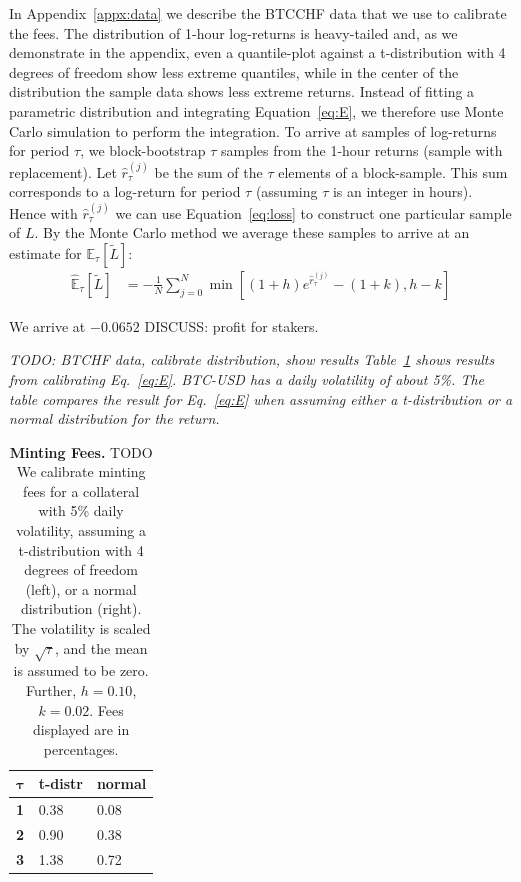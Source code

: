 \documentclass[english,11pt]{article}
\begin{document}
In Appendix~\ref{appx:data} we describe the BTCCHF data that we use to calibrate the
fees. The distribution of 1-hour log-returns is heavy-tailed and, as we demonstrate in the appendix,
even a quantile-plot against a t-distribution with 4 degrees of freedom show less extreme quantiles,
while in the center of the distribution the sample data shows less extreme returns.
Instead of fitting a parametric distribution and integrating Equation~\eqref{eq:E}, we therefore use 
Monte Carlo simulation to perform the integration. To arrive at samples of log-returns for period
$\tau$, we block-bootstrap $\tau$ samples from the 1-hour returns (sample with replacement). Let $\hat{r}_{\tau}^{(j)}$ be the 
sum of the $\tau$ elements of a block-sample. This sum corresponds to a log-return for period $\tau$ (assuming $\tau$ is an integer in hours). 
Hence with $\hat{r}_{\tau}^{(j)}$ we can use Equation~\eqref{eq:loss} 
to construct one particular sample of $L$. By the Monte Carlo method we average these samples
to arrive at an estimate for $\mathbb{E}_{\tau}\left[\tilde{L} \right]$:
\begin{align}
\mathbb{\hat{E}}_{\tau}\left[\tilde{L} \right] &= - \frac{1}{N} \sum_{j=0}^N \min\left[(1 + h) e^{\hat{r}_{\tau}^{(j)}} - (1+k), h-k\right]
\end{align}

We arrive at $-0.0652$ DISCUSS: profit for stakers.


\emph{TODO: BTCHF data, calibrate distribution, show results
Table~\ref{tab:calibration} shows results
from calibrating Eq.~\eqref{eq:E}. BTC-USD has a daily volatility of about 5\%. 
The table compares the result for Eq.~\eqref{eq:E} when assuming
either a t-distribution or a normal distribution for the return.}


\begin{table}[]
\caption{\textbf{Minting Fees.}
    TODO We calibrate minting fees for a collateral with 5\% daily volatility,
    assuming a t-distribution with 4 degrees of freedom (left), or a normal
    distribution (right). The volatility is scaled by $\sqrt{\tau}$, and the
    mean is assumed to be zero. Further, $h=0.10$, $k=0.02$. Fees displayed are in percentages.} %
	\begin{center}
	\begin{tabular}{lll}
	\hline
	\textbf{$\mathbf{\tau}$} & \textbf{t-distr} & \textbf{normal} \\
	\hline
	\textbf{1}                   & 0.38             & 0.08            \\
	\textbf{2}                   & 0.90             & 0.38            \\
	\textbf{3}                   & 1.38             & 0.72   \\        
	\hline
	\end{tabular}
	\label{tab:calibration}
	\end{center}
\end{table}
\end{document}
